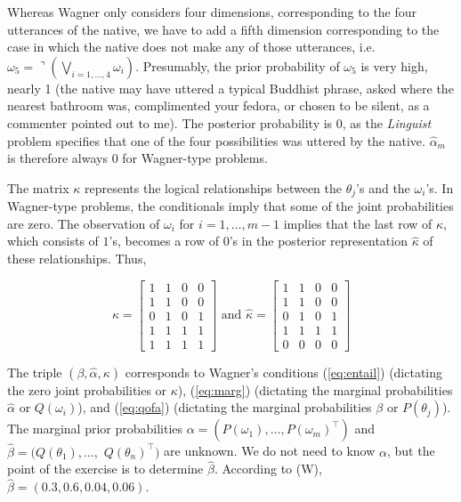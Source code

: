 \documentclass[12pt]{article}
\begin{document}
Whereas Wagner only considers four dimensions, corresponding to the
four utterances of the native, we have to add a fifth dimension
corresponding to the case in which the native does not make any of
those utterances, i.e.\
$\omega_{5}=\urcorner(\bigvee_{i=1,\ldots,4}\omega_{i})$. Presumably,
the prior probability of $\omega_{5}$ is very high, nearly 1 (the
native may have uttered a typical Buddhist phrase, asked where the
nearest bathroom was, complimented your fedora, or chosen to be
silent, as a commenter pointed out to me). The posterior probability
is $0$, as the \emph{Linguist} problem specifies that one of the four
possibilities was uttered by the native. $\hat{\alpha}_{m}$ is
therefore always $0$ for Wagner-type problems.

The matrix $\kappa$ represents the logical relationships between the
$\theta_{j}$'s and the $\omega_{i}$'s. In Wagner-type problems, the
conditionals imply that some of the joint probabilities are zero. The
observation of $\omega_{i}$ for $i=1,\ldots,m-1$ implies that the last
row of $\kappa$, which consists of $1$'s, becomes a row of $0$'s in
the posterior representation $\hat{\kappa}$ of these relationships.
Thus,

\begin{equation}
  \label{eq:p3}
  \kappa=\left[
  \begin{array}{cccc}
    1 & 1 & 0 & 0 \\
    1 & 1 & 0 & 0 \\
    0 & 1 & 0 & 1 \\
    1 & 1 & 1 & 1 \\
    1 & 1 & 1 & 1
  \end{array}
\right]\mbox{ and }
  \hat{\kappa}=\left[
  \begin{array}{cccc}
    1 & 1 & 0 & 0 \\
    1 & 1 & 0 & 0 \\
    0 & 1 & 0 & 1 \\
    1 & 1 & 1 & 1 \\
    0 & 0 & 0 & 0
  \end{array}
\right]
\end{equation}

The triple $(\beta,\hat{\alpha},\kappa)$ corresponds to Wagner's
conditions (\ref{eq:entail}) (dictating the zero joint probabilities
or $\kappa$), (\ref{eq:marg}) (dictating the marginal probabilities
$\hat{\alpha}$ or $Q(\omega_{i})$), and (\ref{eq:qofa}) (dictating the
marginal probabilities $\beta$ or $P(\theta_{j})$). The marginal prior
probabilities
$\alpha=(P(\omega_{1}),\ldots,P(\omega_{m})^{\intercal})$ and
$\hat{\beta}=(Q(\theta_{1}),\ldots,$ $Q(\theta_{n})^{\intercal})$ are
unknown. We do not need to know $\alpha$, but the point of the
exercise is to determine $\hat{\beta}$. According to (W),
$\hat{\beta}=(0.3,0.6,0.04,0.06)$.
\end{document}

